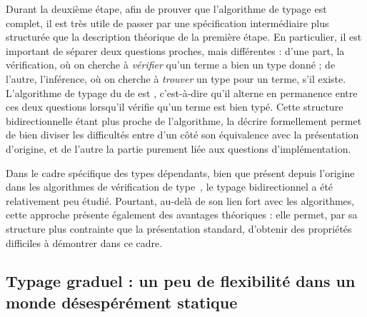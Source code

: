 Durant la deuxième étape, afin de prouver que l’algorithme de typage est complet,
il est très utile de
passer par une spécification intermédiaire plus structurée que la description
théorique de la première étape.
En particulier, il est important de séparer deux questions proches, mais
différentes :
d’une part, la vérification, où on cherche à \emph{vérifier}
qu’un terme a bien un type
donné ; de l’autre, l’inférence, où on cherche à \emph{trouver}
un type pour un terme, s’il existe.
L’algorithme de typage du  de  est ,
c’est-à-dire qu’il alterne en permanence entre ces deux questions
lorsqu’il vérifie qu’un terme est bien typé.
Cette structure bidirectionnelle étant plus proche de l’algorithme,
la décrire formellement permet de bien diviser les difficultés entre d’un côté
son équivalence avec la présentation
d’origine, et de l’autre la partie purement liée aux questions d’implémentation.

Dans le cadre spécifique des types dépendants, bien que présent depuis l’origine dans les algorithmes de vérification de type~,
le typage bidirectionnel a été relativement peu étudié.
Pourtant, au-delà de son lien fort avec les algorithmes,
cette approche présente également des avantages théoriques : elle permet,
par sa structure plus contrainte que la présentation standard,
d’obtenir des propriétés difficiles à démontrer dans ce cadre.

\subsection[Typage graduel]
  {Typage graduel : un peu de flexibilité dans un monde désespérément statique}
\label{sec:intro-graduel}

